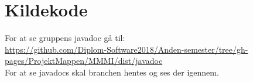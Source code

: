 \chapter{Kildekode}
For at se gruppens javadoc gå til: \\
\url{https://github.com/Diplom-Software2018/Anden-semester/tree/gh-pages/ProjektMappen/MMMI/dist/javadoc}\\
For at se javadocs skal branchen hentes og ses der igennem.